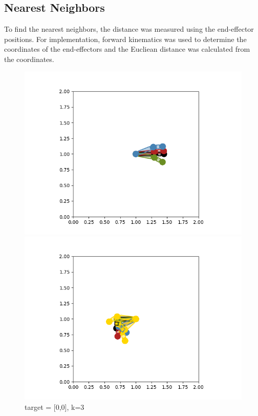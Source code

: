 \documentclass{article}
\begin{document}
\subsection{Nearest Neighbors}
To find the nearest neighbors, the distance was measured using the end-effector positions. For implementation, forward kinematics was used to determine the coordinates of the end-effectors and the Eucliean distance was calculated from the coordinates.
\begin{figure}[htbp]
  \centering
  \begin{minipage}{0.45\textwidth}
    \includegraphics[width=\linewidth]{p1.2.1.png}
    \caption{target = [0,0], k=3}
  \end{minipage}\hfill
  \begin{minipage}{0.45\textwidth}
    \includegraphics[width=\linewidth]{p1.2.2.png}

\end{minipage}
\end{figure}
\end{document}
